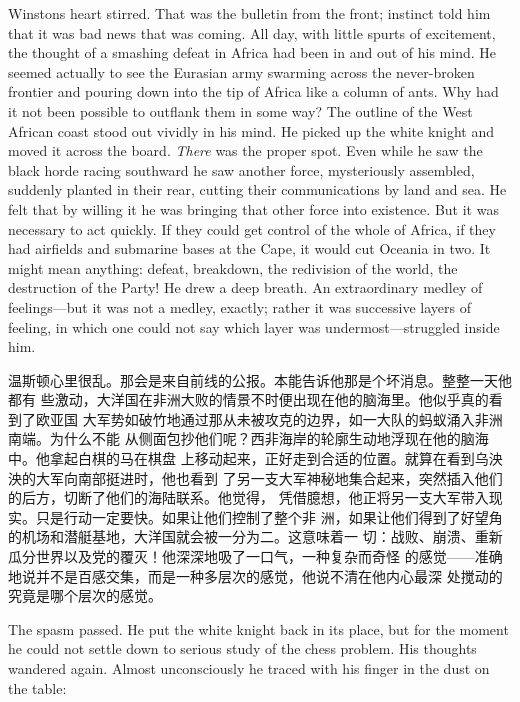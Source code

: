 \begin{paracol}{2}
Winston\textquotesingle s heart stirred. That was the bulletin from the
front; instinct told him that it was bad news that was coming. All day,
with little spurts of excitement, the thought of a smashing defeat in
Africa had been in and out of his mind. He seemed actually to see the
Eurasian army swarming across the never-broken frontier and pouring down
into the tip of Africa like a column of ants. Why had it not been
possible to outflank them in some way? The outline of the West African
coast stood out vividly in his mind. He picked up the white knight and
moved it across the board. \emph{There} was the proper spot. Even while
he saw the black horde racing southward he saw another force,
mysteriously assembled, suddenly planted in their rear, cutting their
communications by land and sea. He felt that by willing it he was
bringing that other force into existence. But it was necessary to act
quickly. If they could get control of the whole of Africa, if they had
airfields and submarine bases at the Cape, it would cut Oceania in two.
It might mean anything: defeat, breakdown, the redivision of the world,
the destruction of the Party! He drew a deep breath. An extraordinary
medley of feelings---but it was not a medley, exactly; rather it was
successive layers of feeling, in which one could not say which layer was
undermost---struggled inside him.

\switchcolumn

温斯顿心里很乱。那会是来自前线的公报。本能告诉他那是个坏消息。整整一天他都有
些激动，大洋国在非洲大败的情景不时便出现在他的脑海里。他似乎真的看到了欧亚国
大军势如破竹地通过那从未被攻克的边界，如一大队的蚂蚁涌入非洲南端。为什么不能
从侧面包抄他们呢？西非海岸的轮廓生动地浮现在他的脑海中。他拿起白棋的马在棋盘
上移动起来，正好走到合适的位置。就算在看到乌泱泱的大军向南部挺进时，他也看到
了另一支大军神秘地集合起来，突然插入他们的后方，切断了他们的海陆联系。他觉得，
凭借臆想，他正将另一支大军带入现实。只是行动一定要快。如果让他们控制了整个非
洲，如果让他们得到了好望角的机场和潜艇基地，大洋国就会被一分为二。这意味着一
切：战败、崩溃、重新瓜分世界以及党的覆灭！他深深地吸了一口气，一种复杂而奇怪
的感觉——准确地说并不是百感交集，而是一种多层次的感觉，他说不清在他内心最深
处搅动的究竟是哪个层次的感觉。

\switchcolumn*

The spasm passed. He put the white knight back in its place, but for the
moment he could not settle down to serious study of the chess problem.
His thoughts wandered again. Almost unconsciously he traced with his
finger in the dust on the table:


\end{paracol}
